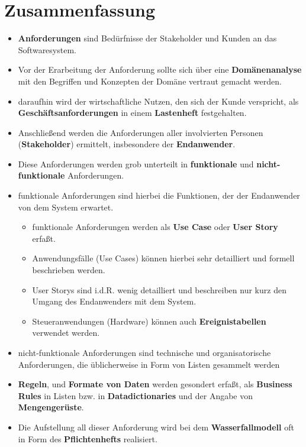 \section{Zusammenfassung}



\begin{itemize}
    \item \textbf{Anforderungen} sind Bedürfnisse der Stakeholder und Kunden an das Softwaresystem.
    \item Vor der Erarbeitung der Anforderung sollte sich über eine \textbf{Domänenanalyse} mit den Begriffen und Konzepten der Domäne vertraut gemacht werden.
    \item daraufhin wird der wirtschaftliche Nutzen, den sich der Kunde verspricht, als \textbf{Geschäftsanforderungen} in einem \textbf{Lastenheft} festgehalten.
    \item Anschließend werden die Anforderungen aller involvierten Personen (\textbf{Stakeholder}) ermittelt, insbesondere der \textbf{Endanwender}.
    \item Diese Anforderungen werden grob unterteilt in \textbf{funktionale} und \textbf{nicht-funktionale} Anforderungen.
    \item funktionale Anforderungen sind hierbei die Funktionen, der der Endanwender von dem System erwartet.
        \begin{itemize}
            \item funktionale Anforderungen werden als \textbf{Use Case} oder \textbf{User Story} erfaßt.
            \item Anwendungsfälle (Use Cases) können hierbei sehr detailliert und formell beschrieben werden.
            \item User Storys sind i.d.R. wenig detailliert und beschreiben nur kurz den Umgang des Endanwenders mit dem System.
            \item Steueranwendungen (Hardware) können auch \textbf{Ereignistabellen} verwendet werden.
        \end{itemize}
    \item nicht-funktionale Anforderungen sind technische und organisatorische Anforderungen, die üblicherweise in Form von Listen gesammelt werden
    \item \textbf{Regeln}, und \textbf{Formate von Daten} werden gesondert erfaßt, als \textbf{Business Rules} in Listen bzw. in \textbf{Datadictionaries} und der Angabe von \textbf{Mengengerüste}.
    \item Die Aufstellung all dieser Anforderung wird bei dem \textbf{Wasserfallmodell} oft in Form des \textbf{Pflichtenhefts} realisiert.
\end{itemize}


